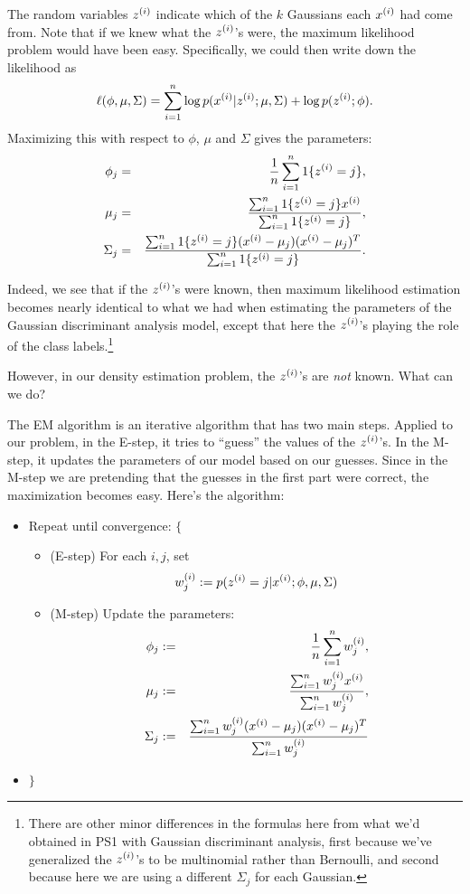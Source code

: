 \documentclass{article}
\begin{document}
The random variables ${z^{(i)}}$ indicate which of the $k$ Gaussians each
${x^{(i)}}$ had come from.  Note that if we knew what the ${z^{(i)}}$'s were,
the maximum likelihood problem would have been easy.  Specifically,
we could then write down the likelihood as
\[
\ell(\phi, \mu, \Sigma) =
\sum_{i=1}^{n} \log p({x^{(i)}}| {z^{(i)}}; \mu, \Sigma) + \log p({z^{(i)}};\phi).
\]
Maximizing this with respect to $\phi$, $\mu$ and $\Sigma$ gives the parameters:
\begin{eqnarray*}
\phi_j &=& \frac{1}{{n}} \sum_{i=1}^{n} 1\{{z^{(i)}} = j\}, \\
\mu_j &=& \frac{\sum_{i=1}^{n} 1\{{z^{(i)}} = j\}{x^{(i)}}}{\sum_{i=1}^{n} 1\{{z^{(i)}} = j\}}, \\
\Sigma_j &=& \frac{\sum_{i=1}^{n} 1\{{z^{(i)}} = j\} ({x^{(i)}} - \mu_j) ({x^{(i)}} - \mu_j)^T}{\sum_{i=1}^{n} 1\{{z^{(i)}} = j\}}.
\end{eqnarray*}

Indeed, we see that if the ${z^{(i)}}$'s were known, then maximum
likelihood estimation
becomes nearly identical to what we had when estimating the parameters
of the Gaussian discriminant analysis model, except that here the ${z^{(i)}}$'s
playing
the role of the class labels.\footnote{There are other minor differences in
the formulas here from what we'd obtained in PS1 with Gaussian
discriminant analysis, first because we've generalized the ${z^{(i)}}$'s to
be multinomial rather than Bernoulli, and second because here we are
using a different $\Sigma_j$ for each Gaussian.}

However, in our density estimation problem, the ${z^{(i)}}$'s are \emph{not}
known.  What can we do?

The EM algorithm is an iterative algorithm that has two main steps.
Applied to our problem, in
the E-step, it tries to ``guess'' the values of the ${z^{(i)}}$'s.
In the M-step, it updates the parameters of our model based on
our guesses.  Since in the M-step we are pretending that the guesses
in the first part were correct, the maximization becomes easy.
Here's the algorithm:

\begin{itemize}
\item[] Repeat until convergence: $\{$
\begin{itemize}
\item[] (E-step) For each $i, j$, set
\[
w^{(i)}_j := p({z^{(i)}} = j | {x^{(i)}} ; \phi, \mu, \Sigma)
\]
\item[] (M-step) Update the parameters:
\begin{eqnarray*}
\phi_j &:=& \frac{1}{{n}} \sum_{i=1}^{n} w^{(i)}_j, \\
\mu_j &:=& \frac{\sum_{i=1}^{n} w^{(i)}_j {x^{(i)}}}{\sum_{i=1}^{n} w^{(i)}_j }, \\
\Sigma_j &:=& \frac{\sum_{i=1}^{n} w^{(i)}_j ({x^{(i)}} - \mu_j) ({x^{(i)}} - \mu_j)^T}{\sum_{i=1}^{n} w^{(i)}_j }
\end{eqnarray*}
\end{itemize}
\item[] $\}$
\end{itemize}
\end{document}

